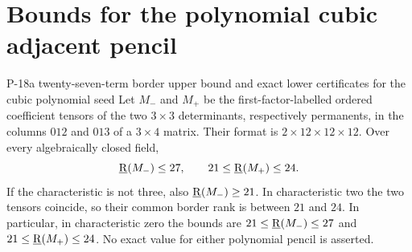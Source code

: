 \section{Bounds for the polynomial cubic adjacent pencil}

\begin{finding}{P-18}{a twenty-seven-term border upper bound and exact lower certificates for the cubic polynomial seed}
Let $M_-$ and $M_+$ be the first-factor-labelled ordered
coefficient tensors of the two $3\times3$ determinants,
respectively permanents, in the columns $012$ and $013$
of a $3\times4$ matrix. Their format is $2\times12\times12\times12$.
Over every algebraically closed field,
\[
 \underline{\mathrm R}(M_-)\leq27,\qquad 21\leq\underline{\mathrm R}(M_+)\leq24.
\]
If the characteristic is not three, also $\underline{\mathrm R}(M_-)\geq21$.
In characteristic two the two tensors coincide, so their
common border rank is between $21$ and $24$.
In particular, in characteristic zero the bounds are
$21\leq\underline{\mathrm R}(M_-)\leq27$ and $21\leq\underline{\mathrm R}(M_+)\leq24$.
No exact value for either polynomial pencil is asserted.
\end{finding}

